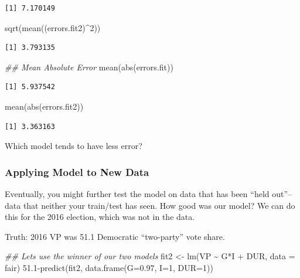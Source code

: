 \documentclass[
  letterpaper,
  DIV=11,
  numbers=noendperiod]{scrreprt}
\newenvironment{Shaded}{\begin{snugshade}}{\end{snugshade}}
\newcommand{\AttributeTok}[1]{\textcolor[rgb]{0.40,0.45,0.13}{#1}}
\newcommand{\DecValTok}[1]{\textcolor[rgb]{0.68,0.00,0.00}{#1}}
\newcommand{\DocumentationTok}[1]{\textcolor[rgb]{0.37,0.37,0.37}{\textit{#1}}}
\newcommand{\FloatTok}[1]{\textcolor[rgb]{0.68,0.00,0.00}{#1}}
\newcommand{\FunctionTok}[1]{\textcolor[rgb]{0.28,0.35,0.67}{#1}}
\newcommand{\NormalTok}[1]{\textcolor[rgb]{0.00,0.23,0.31}{#1}}
\newcommand{\OtherTok}[1]{\textcolor[rgb]{0.00,0.23,0.31}{#1}}
\newcommand{\SpecialCharTok}[1]{\textcolor[rgb]{0.37,0.37,0.37}{#1}}
\begin{document}
\begin{verbatim}
[1] 7.170149
\end{verbatim}

\begin{Shaded}
\begin{Highlighting}[]
\FunctionTok{sqrt}\NormalTok{(}\FunctionTok{mean}\NormalTok{((errors.fit2)}\SpecialCharTok{\^{}}\DecValTok{2}\NormalTok{))}
\end{Highlighting}
\end{Shaded}

\begin{verbatim}
[1] 3.793135
\end{verbatim}

\begin{Shaded}
\begin{Highlighting}[]
\DocumentationTok{\#\# Mean Absolute Error}
\FunctionTok{mean}\NormalTok{(}\FunctionTok{abs}\NormalTok{(errors.fit))}
\end{Highlighting}
\end{Shaded}

\begin{verbatim}
[1] 5.937542
\end{verbatim}

\begin{Shaded}
\begin{Highlighting}[]
\FunctionTok{mean}\NormalTok{(}\FunctionTok{abs}\NormalTok{(errors.fit2))}
\end{Highlighting}
\end{Shaded}

\begin{verbatim}
[1] 3.363163
\end{verbatim}

Which model tends to have less error?

\hypertarget{applying-model-to-new-data}{%
\subsubsection{Applying Model to New
Data}\label{applying-model-to-new-data}}

Eventually, you might further test the model on data that has been
``held out''-- data that neither your train/test has seen. How good was
our model? We can do this for the 2016 election, which was not in the
data.

Truth: 2016 VP was 51.1 Democratic ``two-party'' vote share.

\begin{Shaded}
\begin{Highlighting}[]
\DocumentationTok{\#\# Let\textquotesingle{}s use the winner of our two models}
\NormalTok{fit2 }\OtherTok{\textless{}{-}} \FunctionTok{lm}\NormalTok{(VP }\SpecialCharTok{\textasciitilde{}}\NormalTok{ G}\SpecialCharTok{*}\NormalTok{I }\SpecialCharTok{+}\NormalTok{  DUR, }\AttributeTok{data =}\NormalTok{ fair)}
\FloatTok{51.1}\SpecialCharTok{{-}}\FunctionTok{predict}\NormalTok{(fit2, }\FunctionTok{data.frame}\NormalTok{(}\AttributeTok{G=}\FloatTok{0.97}\NormalTok{, }\AttributeTok{I=}\DecValTok{1}\NormalTok{, }\AttributeTok{DUR=}\DecValTok{1}\NormalTok{))}
\end{Highlighting}
\end{Shaded}
\end{document}

